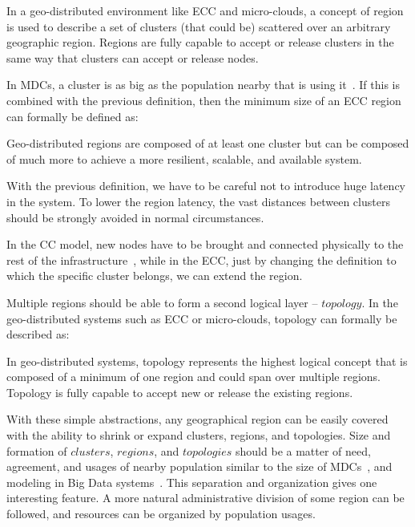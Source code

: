\begin{definition}
	In a geo-distributed environment like ECC and micro-clouds, a concept of region is used to describe a set of clusters (that could be) scattered over an arbitrary geographic region. Regions are fully capable to accept or release clusters in the same way that clusters can accept or release nodes.
\end{definition}

\noindent
In MDCs, a cluster is as big as the population nearby that is using it~\cite{GreenbergHMP09}. If this is combined with the previous definition, then the minimum size of an ECC region can formally be defined as:

\begin{definition}
	Geo-distributed regions are composed of at least one cluster but can be composed of much more to achieve a more resilient, scalable, and available system.
\end{definition}

\noindent
With the previous definition, we have to be careful not to introduce huge latency in the system. To lower the region latency, the vast distances between clusters should be strongly avoided in normal circumstances. 

In the CC model, new nodes have to be brought and connected physically to the rest of the infrastructure~\cite{Hamilton07}, while in the ECC, just by changing the definition to which the specific cluster belongs, we can extend the region.

Multiple regions should be able to form a second logical layer -- $topology$. In the geo-distributed systems such as ECC or micro-clouds, topology can formally be described as:

\begin{definition}
In geo-distributed systems, topology represents the highest logical concept that is composed of a minimum of one region and could span over multiple regions. Topology is fully capable to accept new or release the existing regions. 
\end{definition}

\noindent
With these simple abstractions, any geographical region can be easily covered with the ability to shrink or expand clusters, regions, and topologies. Size and formation of $clusters$, $regions$, and $topologies$ should be a matter of need, agreement, and usages of nearby population similar to the size of MDCs~\cite{GreenbergHMP09}, and modeling in Big Data systems~\cite{SonbolOAA20, WangCAL14}. This separation and organization gives one interesting feature. A more natural administrative division of some region can be followed, and resources can be organized by population usages.

